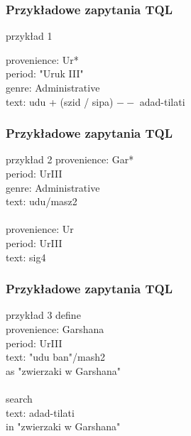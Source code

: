 \documentclass[xcolor=dvipsnames,10pt]{beamer}
\begin{document}
\begin{frame}


     \frametitle{Przykładowe zapytania TQL}

\begin{block}{przykład 1}

provenience: Ur*\\
period: "Uruk III"\\
genre: Administrative\\
text: udu + (szid / sipa) $--$ adad-tilati\\

\end{block}
\end{frame}



\begin{frame}
\frametitle{Przykładowe zapytania TQL}
\begin{block}{przykład 2}
provenience: Gar*\\
period: UrIII\\
genre: Administrative\\
text: udu/masz2\\
~\\
provenience: Ur\\
period: UrIII\\
text: sig4\\
\end{block}
\end{frame}

\begin{frame}
 \frametitle{Przykładowe zapytania TQL}
\begin{block}{przykład 3}
define\\
  provenience: Garshana\\
  period: UrIII\\
  text: "udu ban"/mash2\\
as "zwierzaki w Garshana"\\
~\\
search\\
  text: adad-tilati\\
in "zwierzaki w Garshana"\\
\end{block}
\end{frame}
\end{document}
